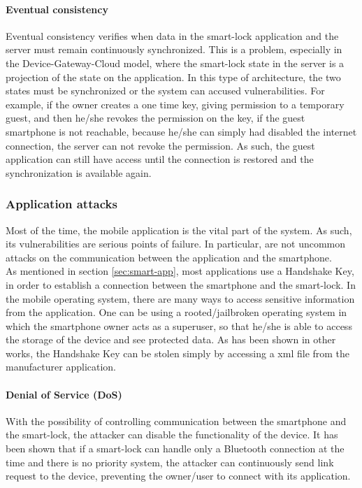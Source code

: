 \paragraph{Eventual consistency}
Eventual consistency verifies when data in the smart-lock application and the server must remain continuously synchronized. This is a problem, especially in the Device-Gateway-Cloud model, where the smart-lock state in the server is a projection of the state on the application. In this type of architecture, the two states must be synchronized or the system can accused vulnerabilities. For example, if the owner creates a one time key, giving permission to a temporary guest, and then he/she revokes the permission on the key, if the guest smartphone is not reachable, because he/she can simply had disabled the internet connection, the server can not revoke the permission. As such, the guest application can still have access until the connection is restored and the synchronization is available again. \cite{10.1145/2897845.2897886}

\subsubsection{Application attacks}
Most of the time, the mobile application is the vital part of the system. As such, its vulnerabilities are serious points of failure. In particular, are not uncommon attacks on the communication between the application and the smartphone. 
\\ As mentioned in section \ref{sec:smart-app}, most applications use a Handshake Key, in order to establish a connection between the smartphone and the smart-lock. In the mobile operating system, there are many ways to access sensitive information from the application. One can be using a rooted/jailbroken operating system in which the smartphone owner acts as a superuser, so that he/she is able to access the storage of the device and see protected data. As has been shown in other works\cite{8116427}, the Handshake Key can be stolen simply by accessing a \acrshort{xml} file from the manufacturer application.  

\paragraph{Denial of Service (DoS)}
With the possibility of controlling communication between the smartphone and the smart-lock, the attacker can disable the functionality of the device. It has been shown that if a smart-lock can handle only a Bluetooth connection at the time and there is no priority system, the attacker can continuously send link request to the device, preventing the owner/user to connect with its application\cite{8116427}. 

